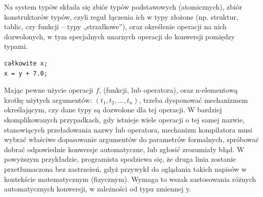 Na system typów składa się zbiór typów podstawowych (atomicznych), zbiór konstruktorów typów, czyli reguł łączenia ich w typy złożone (np. struktur, tablic, czy funkcji – typy „strzałkowe”), oraz określenie operacji na nich dozwolonych, w tym specjalnych unarnych operacji do konwersji pomiędzy typami.
\begin{lstlisting}
całkowite x;
x = y + 7.0;
\end{lstlisting}
Mając pewne użycie operacji $f$, (funkcji, lub operatora), oraz n-elementową krotkę użytych argumentów: $(t_1, t_2, ..., t_n)$, trzeba dysponować mechanizmem określającym, czy dane typy są dozwolone dla tej operacji. W bardziej skomplikowanych przypadkach, gdy istnieje wiele operacji o tej samej nazwie, stanowiących przeładowania nazwy lub operatora, mechanizm kompilatora musi wybrać właściwe dopasowanie argumentów do parametrów formalnych, spróbować dobrać odpowiednie konwersje automatyczne, lub zgłosić zrozumiały błąd.
W powyższym przykładzie, programista spodziewa się, że druga linia zostanie przetłumaczona bez zastrzeżeń, gdyż przywykł do oglądania takich napisów w kontekście matematycznym (fizycznym). Wymaga to wszak zastosowania różnych automatycznych konwersji, w zależności od typu zmiennej y.
\lstset{
    escapechar=|,
    breaklines=true
}
\newpage
